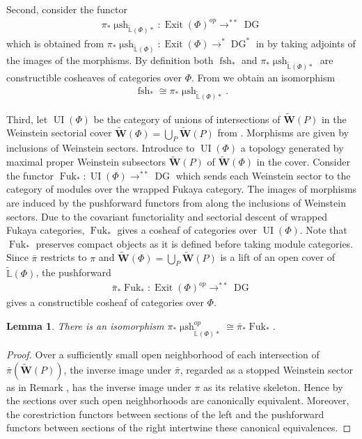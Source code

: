 \documentclass[a4paper,12pt, twoside, pdftex]{amsart}
\newtheorem{lemma}[dummy]{Lemma}
\theoremstyle{definition}
\numberwithin{equation}{section}
\newcommand{\pref}{\prettyref}
\newcommand{\DG}{\operatorname{DG}}
\newcommand{\Exit}{\operatorname{Exit}}
\newcommand{\Fuk}{\operatorname{Fuk}}
\newcommand{\fsh}{\operatorname{fsh}}
\newcommand{\msh}{\operatorname{\mu sh}}
\newcommand{\UI}{\operatorname{UI}}
\newcommand{\bL}{\mathbb{L}}
\newcommand{\bfW}{\mathbf{W}}
\begin{document}
Second,
consider the functor
\begin{align*}
\pi_* \msh_{\widetilde{\bL}(\Phi) *}
\colon
\Exit(\Phi)^{op}
\to
^{**} \DG
\end{align*}
which is obtained from
$\pi_* \msh_{\widetilde{\bL}(\Phi)}
\colon
\Exit(\Phi)
\to
^{*} \DG^*$
in
\cite[Section 4.5]{GS1}
by taking adjoints of the images of the morphisms.
By definition both
$\fsh_*$
and
$\pi_* \msh_{\widetilde{\bL}(\Phi) *}$
are constructible cosheaves of categories over
$\Phi$.
From
\cite[Proposition 4.34]{GS1}
we obtain an isomorphism
\begin{align*}
\fsh_*
\cong
\pi_* \msh_{\widetilde{\bL}(\Phi) *}.
\end{align*}

Third,
let
$\UI(\Phi)$
be the category of unions of intersections of
$\widetilde{\bfW}(P)$
in the Weinstein sectorial cover
$\widetilde{\bfW}(\Phi)
=
\bigcup_P \widetilde{\bfW}(P)$
from
\pref{lem:W-SC}.
Morphisms are given by inclusions of Weinstein sectors.
Introduce to
$\UI(\Phi)$
a topology generated by maximal proper Weinstein subsectors
$\widetilde{\bfW}(P)$
of
$\widetilde{\bfW}(\Phi)$
in the cover.
Consider the functor
$\Fuk_*
\colon
\UI(\Phi)
\to
^{**} \DG$
which sends
each Weinstein sector to the category of modules over the wrapped Fukaya category.
The images of morphisms are induced by the pushforward functors from
\cite{GPS1}
along the inclusions of Weinstein sectors.
Due to
the covariant functoriality
and
sectorial descent
of wrapped Fukaya categories,
$\Fuk_*$
gives a cosheaf of categories over
$\UI(\Phi)$.
Note that
$\Fuk_*$
preserves compact objects
as it is defined before taking module categories.
Since
$\bar{\pi}$
restricts to
$\pi$
and
$\widetilde{\bfW}(\Phi)
=
\bigcup_P \widetilde{\bfW}(P)$
is a lift of an open cover of
$\widetilde{\bL}(\Phi)$,
the pushforward
\begin{align*}
\bar{\pi}_* \Fuk_*
\colon
\Exit(\Phi)^{op}
\to
^{**} \DG
\end{align*}
gives a constructible cosheaf of categories over
$\Phi$.

\begin{lemma} \label{lem:topological}
There is an isomorphism
$\pi_* \msh^{op}_{\widetilde{\bL}(\Phi) *}
\cong
\bar{\pi}_* \Fuk_*$.
\end{lemma}
\begin{proof}
Over a sufficiently small open neighborhood of each intersection of
$\bar{\pi}(\widetilde{\bfW}(P))$,
the inverse image under
$\bar{\pi}$,
regarded as a stopped Weinstein sector as in Remark
\pref{rmk:2.3},
has the inverse image under
$\pi$
as its relative skeleton.
Hence by
\cite[Theorem 1.4]{GPS3}
the sections over such open neighborhoods are canonically equivalent.
Moreover,
the corestriction functors between sections of the left
and
the pushforward functors between sections of the right
intertwine these canonical equivalences. 
\end{proof}
\end{document}
